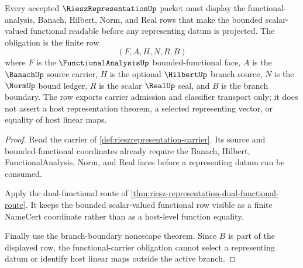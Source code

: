 \begin{theorem}
\label{thm:riesz-representation-functional-carrier-obligation}
Every accepted $\RieszRepresentationUp$ packet must display the functional-analysis, Banach, Hilbert, Norm, and Real rows that make the bounded scalar-valued functional readable before any representing datum is projected. The obligation is the finite row
$$
(F,A,H,N,R,B)
$$
where $F$ is the $\FunctionalAnalysisUp$ bounded-functional face, $A$ is the $\BanachUp$ source carrier, $H$ is the optional $\HilbertUp$ branch source, $N$ is the $\NormUp$ bound ledger, $R$ is the scalar $\RealUp$ seal, and $B$ is the branch boundary. The row exports carrier admission and classifier transport only; it does not assert a host representation theorem, a selected representing vector, or equality of host linear maps.
\end{theorem}
\begin{proof}
Read the carrier of \autoref{def:rieszrepresentation-carrier}. Its source and bounded-functional coordinates already require the Banach, Hilbert, FunctionalAnalysis, Norm, and Real faces before a representing datum can be consumed.

Apply the dual-functional route of \autoref{thm:riesz-representation-dual-functional-route}. It keeps the bounded scalar-valued functional row visible as a finite NameCert coordinate rather than as a host-level function equality.

Finally use the branch-boundary nonescape theorem. Since $B$ is part of the displayed row, the functional-carrier obligation cannot select a representing datum or identify host linear maps outside the active branch.
\end{proof}

